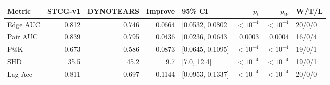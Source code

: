 \begin{tabular}{lrrrlrrl}
\toprule
Metric & STCG-v1 & DYNOTEARS & Improve & 95\% CI & $p_t$ & $p_W$ & W/T/L \\
\midrule
Edge AUC & 0.812 & 0.746 & 0.0664 & [0.0532, 0.0802] & $<10^{-4}$ & $<10^{-4}$ & 20/0/0 \\
Pair AUC & 0.839 & 0.795 & 0.0436 & [0.0236, 0.0643] & 0.0003 & 0.0004 & 16/0/4 \\
P@K & 0.673 & 0.586 & 0.0873 & [0.0645, 0.1095] & $<10^{-4}$ & $<10^{-4}$ & 19/0/1 \\
SHD & 35.5 & 45.2 & 9.7 & [7.0, 12.4] & $<10^{-4}$ & $<10^{-4}$ & 19/0/1 \\
Lag Acc & 0.811 & 0.697 & 0.1144 & [0.0953, 0.1337] & $<10^{-4}$ & $<10^{-4}$ & 20/0/0 \\
\bottomrule
\end{tabular}
